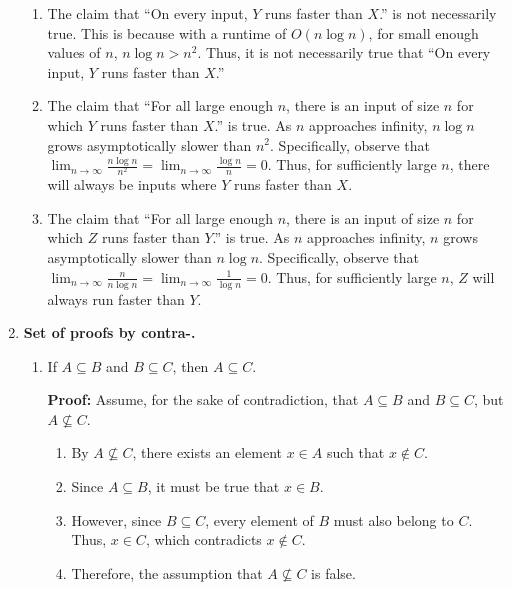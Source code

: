 \documentclass{article}
\begin{document}
\begin{enumerate}
\begin{enumerate}
        \item The claim that ``On every input, $Y$ runs faster than $X$.'' is not necessarily true. This is because with a runtime of $O(n \log n)$, for small enough values of $n$, $n \log n > n^2$. Thus, it is not necessarily true that ``On every input, $Y$ runs faster than $X$.''
    
    
    
        \item The claim that ``For all large enough $n$, there is an input of size $n$ for which $Y$ runs faster than $X$.'' is true. As $n$ approaches infinity, $n \log n$ grows asymptotically slower than $n^2$. Specifically, observe that $\lim_{n \to \infty} \frac{n \log n}{n^2} = \lim_{n \to \infty} \frac{\log n}{n} = 0$. Thus, for sufficiently large $n$, there will always be inputs where $Y$ runs faster than $X$.
        


        \item The claim that ``For all large enough $n$, there is an input of size $n$ for which $Z$ runs faster than $Y$.'' is true. As $n$ approaches infinity, $n$ grows asymptotically slower than $n \log n$. Specifically, observe that $\lim_{n \to \infty} \frac{n}{n \log n} = \lim_{n \to \infty} \frac{1}{\log n} = 0$. Thus, for sufficiently large $n$, $Z$ will always run faster than $Y$.
    \end{enumerate}
    \hfill \break


    \item \textbf{Set of proofs by contra-.}
    \begin{enumerate}
        \item If $A \subseteq B$ and $B \subseteq C$, then $A \subseteq C$.
    
        \textbf{Proof:} Assume, for the sake of contradiction, that $A \subseteq B$ and $B \subseteq C$, but $A \nsubseteq C$.
    
        \begin{enumerate}
            \item By $A \nsubseteq C$, there exists an element $x \in A$ such that $x \notin C$.
            \item Since $A \subseteq B$, it must be true that $x \in B$.
            \item However, since $B \subseteq C$, every element of $B$ must also belong to $C$. Thus, $x \in C$, which contradicts $x \notin C$.
            \item Therefore, the assumption that $A \nsubseteq C$ is false.
        \end{enumerate}
    

\end{enumerate}
\end{enumerate}
\end{document}
